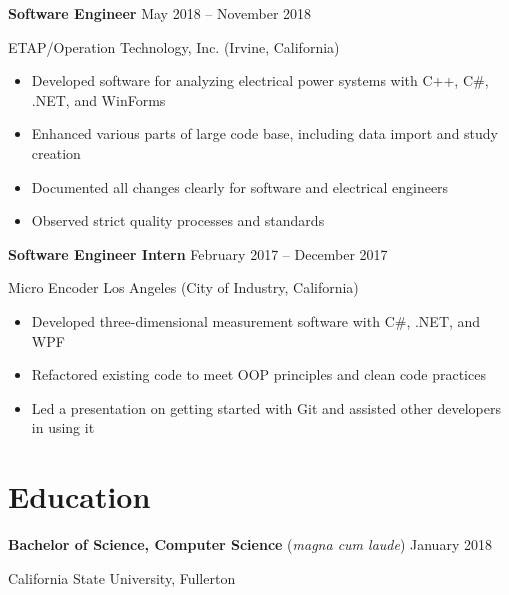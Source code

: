 \documentclass[10pt]{article}
\newcommand{\titleheader}[2]{\textbf{#1} \hfill #2}
\newcommand{\titleextraheader}[3]{\textbf{#1} (#3) \hfill #2}
\newcommand{\locheader}[2]{#1 (#2)}
\newcommand{\instheader}[1]{#1}
\begin{document}
	\titleheader{Software Engineer}{May 2018 -- November 2018}

	\locheader{ETAP/Operation Technology, Inc.}{Irvine, California}

	\begin{itemize}
		\item Developed software for analyzing electrical power systems with C++, C\#, .NET, and WinForms
		\item Enhanced various parts of large code base, including data import and study creation
		\item Documented all changes clearly for software and electrical engineers
		\item Observed strict quality processes and standards
	\end{itemize}

	\titleheader{Software Engineer Intern}{February 2017 -- December 2017}

	\locheader{Micro Encoder Los Angeles}{City of Industry, California}

	\begin{itemize}
		\item Developed three-dimensional measurement software with C\#, .NET, and WPF
		\item Refactored existing code to meet OOP principles and clean code practices
		\item Led a presentation on getting started with Git and assisted other developers in using it
	\end{itemize}

	\section*{Education}

	\titleextraheader{Bachelor of Science, Computer Science}{January 2018}{\textit{magna cum laude}}

	\instheader{California State University, Fullerton}
\end{document}

